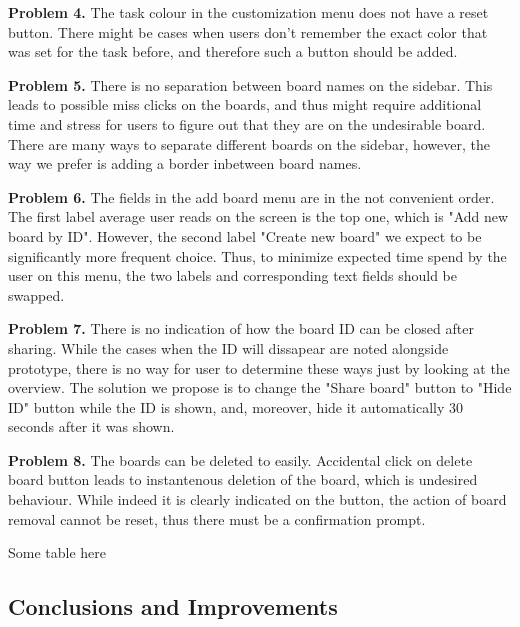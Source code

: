\noindent
\textbf{Problem 4.} The task colour in the customization menu does not have a reset button. There might be cases when users don't remember the exact color that was set for the task before, and therefore such a button should be added.

\noindent
\textbf{Problem 5.} There is no separation between board names on the sidebar. This leads to possible miss clicks on the boards, and thus might require additional time and stress for users to figure out that they are on the undesirable board. There are many ways to separate different boards on the sidebar, however, the way we prefer is adding a border inbetween board names.

\noindent
\textbf{Problem 6.} The fields in the add board menu are in the not convenient order. The first label average user reads on the screen is the top one, which is "Add new board by ID". However, the second label "Create new board" we expect to be significantly more frequent choice. Thus, to minimize expected time spend by the user on this menu, the two labels and corresponding text fields should be swapped.

\noindent
\textbf{Problem 7.} There is no indication of how the board ID can be closed after sharing. While the cases when the ID will dissapear are noted alongside prototype, there is no way for user to determine these ways just by looking at the overview. The solution we propose is to change the "Share board" button to "Hide ID" button while the ID is shown, and, moreover, hide it automatically 30 seconds after it was shown.

\noindent
\textbf{Problem 8.} The boards can be deleted to easily. Accidental click on delete board button leads to instantenous deletion of the board, which is undesired behaviour. While indeed it is clearly indicated on the button, the action of board removal cannot be reset, thus there must be a confirmation prompt.


Some table here


\subsection{Conclusions and Improvements}



